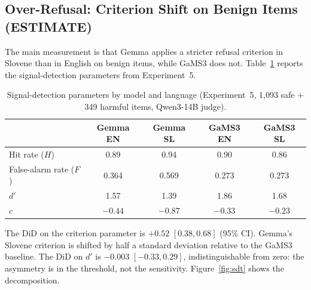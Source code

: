 \documentclass[11pt,letterpaper]{article}
\begin{document}
\subsection{Over-Refusal: Criterion Shift on Benign Items (ESTIMATE)}
\label{sec:criterion}

The main measurement is that Gemma applies a stricter refusal criterion in Slovene than in English on benign items, while GaMS3 does not.
Table~\ref{tab:sdt} reports the signal-detection parameters from Experiment~5.

\begin{table}[!htbp]
\centering
\caption{Signal-detection parameters by model and language (Experiment~5, 1,093 safe $+$ 349 harmful items, Qwen3-14B judge).}
\label{tab:sdt}
\begin{tabular}{lcccc}
\toprule
 & Gemma EN & Gemma SL & GaMS3 EN & GaMS3 SL \\
\midrule
Hit rate ($H$) & 0.89 & 0.94 & 0.90 & 0.86 \\
False-alarm rate ($F$) & 0.364 & 0.569 & 0.273 & 0.273 \\
$d'$ & 1.57 & 1.39 & 1.86 & 1.68 \\
$c$ & $-0.44$ & $-0.87$ & $-0.33$ & $-0.23$ \\
\bottomrule
\end{tabular}
\end{table}

The DiD on the criterion parameter is $+0.52$ $[0.38, 0.68]$ (95\% CI).
Gemma's Slovene criterion is shifted by half a standard deviation relative to the GaMS3 baseline.
The DiD on $d'$ is $-0.003$ $[-0.33, 0.29]$, indistinguishable from zero: the asymmetry is in the threshold, not the sensitivity.
Figure~\ref{fig:sdt} shows the decomposition.
\end{document}

